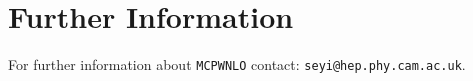 \documentclass[12pt,a4paper,oneside]{article}
\begin{document}
\section{Further Information}
For further information about {\tt MCPWNLO} contact: {\tt seyi@hep.phy.cam.ac.uk}.


\end{document}
